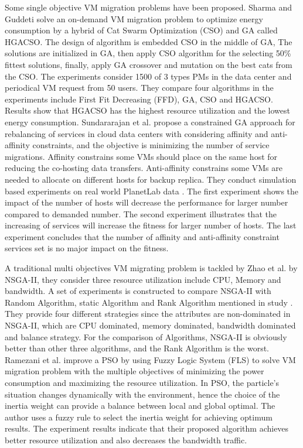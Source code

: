 \documentclass[onecolumn,10pt]{asme2ej}
\begin{document}
Some single objective VM migration problems have been proposed. Sharma and Guddeti \cite{sharma2016demand} solve an on-demand VM migration problem to optimize energy consumption by a hybrid of Cat Swarm Optimization (CSO) and GA called HGACSO. The design of algorithm is embedded CSO in the middle of GA, The solutions are initialized in GA, then apply CSO algorithm for the selecting 50\% fittest solutions, finally, apply GA crossover and mutation on the best cats from the CSO. The experiments consider 1500 of 3 types PMs in the data center and periodical VM request from 50 users. They compare four algorithms in the experiments include First Fit Decreasing (FFD), GA, CSO and HGACSO. Results show that HGACSO has the highest resource utilization and the lowest energy consumption. Sundararajan et al. \cite{sundararajan2015constrained} propose a constrained GA approach for rebalancing of services in cloud data centers with considering affinity and anti-affinity constraints, and the objective is minimizing the number of service migrations. Affinity constrains some VMs should place on the same host for reducing the co-hosting data transfers. Anti-affinity constrains some VMs are needed to allocate on different hosts for backup replica. They conduct simulation based experiments on real world PlanetLab data \cite{park2006comon}. The first experiment shows the impact of the number of hosts will decrease the performance for larger number compared to demanded number. The second experiment  illustrates that the increasing of services will increase the fitness for larger number of hosts. The last experiment concludes that the number of affinity and anti-affinity constraint services set is no major impact on the fitness. 

A traditional multi objectives VM migrating problem is tackled by Zhao et al. \cite{zhao2011multi} by NSGA-II, they consider three resource utilization include CPU, Memory and bandwidth. A set of experiments is constructed to compare NSGA-II with Random Algorithm, static Algorithm and Rank Algorithm mentioned in study \cite{sotomayor2009virtual}. They provide four different strategies since the attributes are non-dominated in NSGA-II, which are CPU dominated, memory dominated, bandwidth dominated and balance strategy. For the comparison of Algorithms, NSGA-II is obviously better than other three algorithms, and the Rank Algorithm is the worst. Ramezani et al. \cite{ramezani2016multi} improve a PSO by using Fuzzy Logic System (FLS) to solve VM migration problem with the multiple objectives of minimizing the power consumption and maximizing the resource utilization. In PSO, the particle’s situation changes dynamically with the environment, hence the choice of the inertia weight can provide a balance between local and global optimal. The author uses a fuzzy rule to select the inertia weight for achieving optimum results. The experiment results indicate that their proposed algorithm achieves better resource utilization and also decreases the bandwidth traffic.
\end{document}

